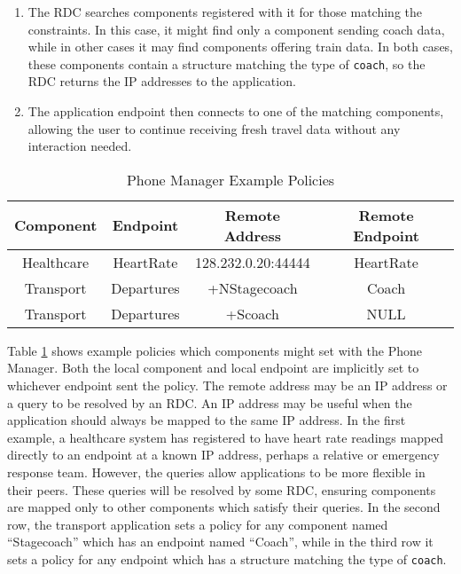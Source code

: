 \documentclass[12pt,twoside,notitlepage]{report}
\begin{document}
\begin{enumerate}
\item The RDC searches components registered with it for those matching the constraints. In this case, it might find only a component sending coach data, while in other cases it may find components offering train data. In both cases, these components contain a structure matching the type of {\tt coach}, so the RDC returns the IP addresses to the application.

\item The application endpoint then connects to one of the matching components, allowing the user to continue receiving fresh travel data without any interaction needed.

\end{enumerate}

\begin{table}
\centering

\begin{tabular}{c c c c}
\hline\hline
Component & Endpoint & Remote Address & Remote Endpoint \\
\hline

Healthcare & HeartRate & 128.232.0.20:44444 & HeartRate \\
Transport & Departures & +NStagecoach & Coach \\
Transport & Departures & +Scoach & NULL \\

\hline
\end{tabular}

\caption{Phone Manager Example Policies}
\label{tab:example_policies}
\end{table}

Table \ref{tab:example_policies} shows example policies which components might set with the Phone Manager. 
Both the local component and local endpoint are implicitly set to whichever endpoint sent the policy. 
The remote address may be an IP address or a query to be resolved by an RDC. 
An IP address may be useful when the application should always be mapped to the same IP address. 
In the first example, a healthcare system has registered to have heart rate readings mapped directly to an endpoint at a known IP address, perhaps a relative or emergency response team. 
However, the queries allow applications to be more flexible in their peers. 
These queries will be resolved by some RDC, ensuring components are mapped only to other components which satisfy their queries. 
In the second row, the transport application sets a policy for any component named ``Stagecoach'' which has an endpoint named ``Coach'', while in the third row it sets a policy for any endpoint which has a structure matching the type of {\tt coach}. 
\end{document}
